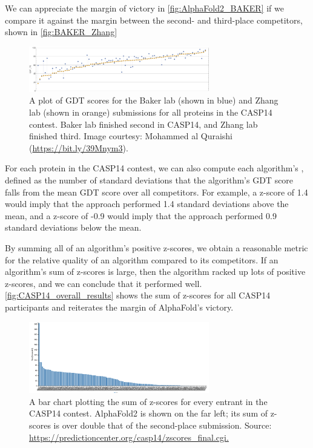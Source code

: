 We can appreciate the margin of victory in \autoref{fig:AlphaFold2_BAKER} if we compare it against the margin between the second- and third-place competitors, shown in \autoref{fig:BAKER_Zhang}

\begin{figure}[h]
	\centering
	\mySfFamily
	\includegraphics[width = 0.7\textwidth]{../images/BAKER_Zhang.png}
	\caption{A plot of GDT scores for the Baker lab (shown in blue) and Zhang lab (shown in orange) submissions for all proteins in the CASP14 contest. Baker lab finished second in CASP14, and Zhang lab finished third. Image courtesy: Mohammed al Quraishi (\url{https://bit.ly/39Mnym3}).}
	\label{fig:BAKER_Zhang}
\end{figure}

For each protein in the CASP14 contest, we can also compute each algorithm's , defined as the number of standard deviations that the algorithm's GDT score falls from the mean GDT score over all competitors. For example, a z-score of 1.4 would imply that the approach performed 1.4 standard deviations above the mean, and a z-score of -0.9 would imply that the approach performed 0.9 standard deviations below the mean.

By summing all of an algorithm's positive z-scores, we obtain a reasonable metric for the relative quality of an algorithm compared to its competitors. If an algorithm's sum of z-scores is large, then the algorithm racked up lots of positive z-scores, and we can conclude that it performed well. \autoref{fig:CASP14_overall_results} shows the sum of z-scores for all CASP14 participants and reiterates the margin of AlphaFold's victory.

\begin{figure}[h]
	\centering
	\mySfFamily
	\includegraphics[width = 0.7\textwidth]{../images/CASP14_overall_results.png}
	\caption{A bar chart plotting the sum of z-scores for every entrant in the CASP14 contest. AlphaFold2 is shown on the far left; its sum of z-scores is over double that of the second-place submission. Source: \url{https://predictioncenter.org/casp14/zscores_final.cgi.}}
	\label{fig:CASP14_overall_results}
\end{figure}

